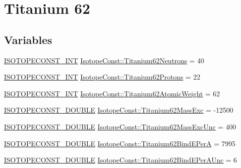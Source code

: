 \hypertarget{group___isotope_const-_titanium-_ti62}{}\section{Titanium 62}
\label{group___isotope_const-_titanium-_ti62}
\subsection*{Variables}
\begin{DoxyCompactItemize}
\item 
\mbox{\hyperlink{group___isotope_const-_macros_ga5f18360b3e99483a35c32d789e62621c}{I\+S\+O\+T\+O\+P\+E\+C\+O\+N\+S\+T\+\_\+\+I\+NT}} \mbox{\hyperlink{group___isotope_const-_titanium-_ti62_gaa272b49ed5b6386db69465cd553dabc9}{Isotope\+Const\+::\+Titanium62\+Neutrons}} = 40
\item 
\mbox{\hyperlink{group___isotope_const-_macros_ga5f18360b3e99483a35c32d789e62621c}{I\+S\+O\+T\+O\+P\+E\+C\+O\+N\+S\+T\+\_\+\+I\+NT}} \mbox{\hyperlink{group___isotope_const-_titanium-_ti62_ga70481795c0f853069a8f6ed2c5c82282}{Isotope\+Const\+::\+Titanium62\+Protons}} = 22
\item 
\mbox{\hyperlink{group___isotope_const-_macros_ga5f18360b3e99483a35c32d789e62621c}{I\+S\+O\+T\+O\+P\+E\+C\+O\+N\+S\+T\+\_\+\+I\+NT}} \mbox{\hyperlink{group___isotope_const-_titanium-_ti62_ga61ab407a04e367a2e7e30c01c2b365f0}{Isotope\+Const\+::\+Titanium62\+Atomic\+Weight}} = 62
\item 
\mbox{\hyperlink{group___isotope_const-_macros_ga8f45a7272ce02c0b4c65c44636ed719a}{I\+S\+O\+T\+O\+P\+E\+C\+O\+N\+S\+T\+\_\+\+D\+O\+U\+B\+LE}} \mbox{\hyperlink{group___isotope_const-_titanium-_ti62_ga4434df557d92c1d1e924a2f01a9ae213}{Isotope\+Const\+::\+Titanium62\+Mass\+Exc}} = -\/12500
\item 
\mbox{\hyperlink{group___isotope_const-_macros_ga8f45a7272ce02c0b4c65c44636ed719a}{I\+S\+O\+T\+O\+P\+E\+C\+O\+N\+S\+T\+\_\+\+D\+O\+U\+B\+LE}} \mbox{\hyperlink{group___isotope_const-_titanium-_ti62_ga6db210ada3bc51db32dcd382b8beffda}{Isotope\+Const\+::\+Titanium62\+Mass\+Exc\+Unc}} = 400
\item 
\mbox{\hyperlink{group___isotope_const-_macros_ga8f45a7272ce02c0b4c65c44636ed719a}{I\+S\+O\+T\+O\+P\+E\+C\+O\+N\+S\+T\+\_\+\+D\+O\+U\+B\+LE}} \mbox{\hyperlink{group___isotope_const-_titanium-_ti62_gaf8484d9ebb01eacba42c7729810d470c}{Isotope\+Const\+::\+Titanium62\+Bind\+E\+PerA}} = 7995
\item 
\mbox{\hyperlink{group___isotope_const-_macros_ga8f45a7272ce02c0b4c65c44636ed719a}{I\+S\+O\+T\+O\+P\+E\+C\+O\+N\+S\+T\+\_\+\+D\+O\+U\+B\+LE}} \mbox{\hyperlink{group___isotope_const-_titanium-_ti62_ga6fac0cacf99b3ec83dbaba0cbdce8059}{Isotope\+Const\+::\+Titanium62\+Bind\+E\+Per\+A\+Unc}} = 6

\end{DoxyCompactItemize}

